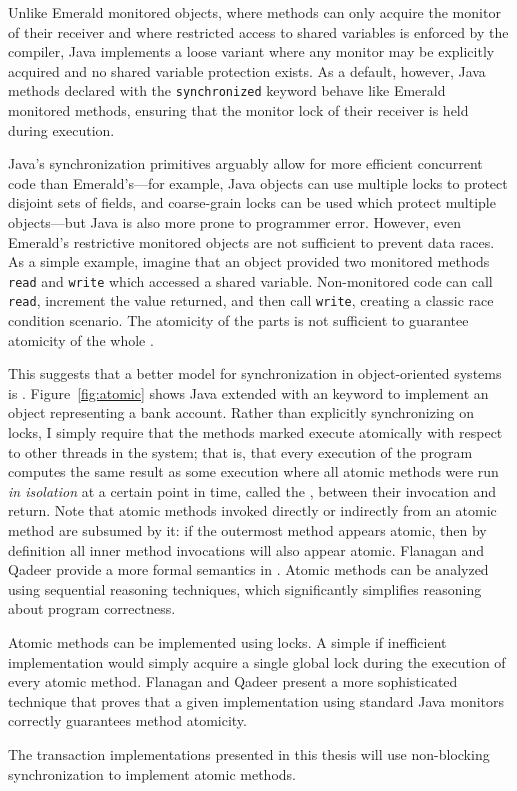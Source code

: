 Unlike Emerald monitored objects, where methods can only acquire the
monitor of their receiver and where restricted access to shared
variables is enforced by the compiler, Java implements a loose
variant where any monitor may be explicitly acquired and no shared
variable protection exists.  As a default, however, Java methods
declared with the {\tt synchronized} keyword behave like Emerald
monitored methods,
ensuring that the monitor lock of their receiver is held during execution.

Java's synchronization primitives arguably allow for more efficient
concurrent code than Emerald's---for example, Java objects can use
multiple locks to
protect disjoint sets of fields, and coarse-grain locks can be used
which protect multiple objects---but Java is also more prone to programmer
error.  However, even Emerald's restrictive
monitored objects are not sufficient to prevent data races.  As a
simple example, imagine that an object provided two monitored methods
{\tt read} and {\tt write} which accessed a shared variable.
Non-monitored code can call {\tt read}, increment the value returned,
and then call {\tt write}, creating a classic race condition scenario.
The atomicity of the parts is not sufficient to guarantee atomicity of
the whole \cite{FlanaganQa03}.

This suggests that a better model for synchronization in
object-oriented systems is .  Figure~\ref{fig:atomic}
shows Java extended with an \atomic keyword to implement an
object representing a bank account.  Rather than explicitly
synchronizing on locks, I simply require that the methods marked
\atomic execute atomically with respect to other threads in the
system; that is, that every execution of the program computes the same
result as some execution where all atomic methods were run \emph{in
  isolation} at a certain point in time, called the
, between their invocation and return.
Note that
atomic methods invoked directly or indirectly from an atomic
method are subsumed by it: if the outermost method appears atomic,
then by definition all inner method invocations will also appear atomic.
Flanagan and Qadeer provide a more formal semantics in \cite{FlanaganQa03}.
Atomic methods can be analyzed using sequential reasoning techniques, which
significantly simplifies reasoning about program correctness.

Atomic methods can be implemented using locks.  A simple if inefficient
implementation would simply acquire a single global lock during
the execution of every atomic method.  Flanagan and Qadeer
\cite{FlanaganQa03} present a more sophisticated technique that proves that
a given implementation using standard Java monitors correctly
guarantees method atomicity.

The transaction implementations presented in this thesis will use
non-blocking synchronization to implement atomic methods.


